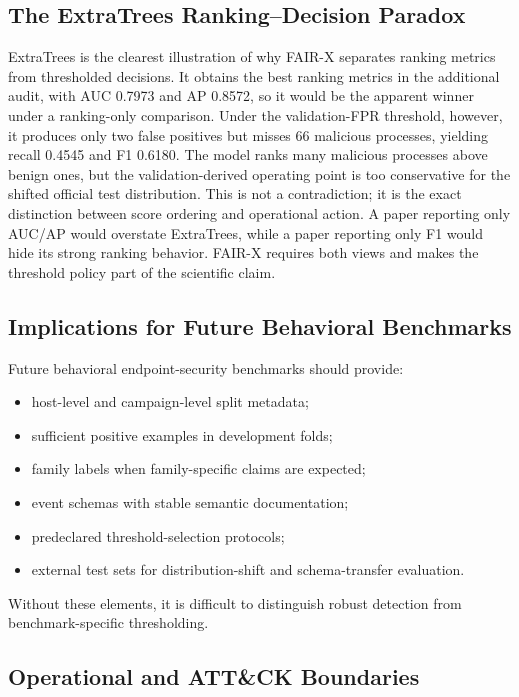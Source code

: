 \documentclass[10pt,journal,compsoc]{IEEEtran}
\begin{document}
\subsection{The ExtraTrees Ranking--Decision Paradox}

ExtraTrees is the clearest illustration of why FAIR-X separates ranking metrics from thresholded decisions. It obtains the best ranking metrics in the additional audit, with AUC 0.7973 and AP 0.8572, so it would be the apparent winner under a ranking-only comparison. Under the validation-FPR threshold, however, it produces only two false positives but misses 66 malicious processes, yielding recall 0.4545 and F1 0.6180. The model ranks many malicious processes above benign ones, but the validation-derived operating point is too conservative for the shifted official test distribution. This is not a contradiction; it is the exact distinction between score ordering and operational action. A paper reporting only AUC/AP would overstate ExtraTrees, while a paper reporting only F1 would hide its strong ranking behavior. FAIR-X requires both views and makes the threshold policy part of the scientific claim.

\subsection{Implications for Future Behavioral Benchmarks}

Future behavioral endpoint-security benchmarks should provide:
\begin{itemize}
    \item host-level and campaign-level split metadata;
    \item sufficient positive examples in development folds;
    \item family labels when family-specific claims are expected;
    \item event schemas with stable semantic documentation;
    \item predeclared threshold-selection protocols;
    \item external test sets for distribution-shift and schema-transfer evaluation.
\end{itemize}
Without these elements, it is difficult to distinguish robust detection from benchmark-specific thresholding.

\subsection{Operational and ATT\&CK Boundaries}
\label{sec:response}
\end{document}
